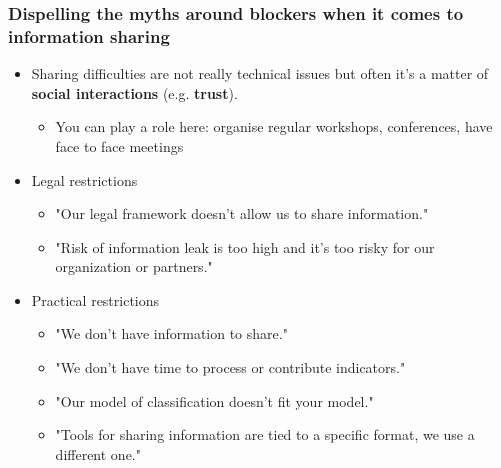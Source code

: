 \begin{frame}
\frametitle{Dispelling the myths around blockers when it comes to information sharing}
        \begin{itemize}
                \item Sharing difficulties are not really technical issues but often it's a matter of {\bf social interactions} (e.g. {\bf trust}).
		\begin{itemize}
			\item You can play a role here: organise regular workshops, conferences, have face to face meetings
		\end{itemize}
                \item Legal restrictions
                        \begin{itemize}
                                \item "Our legal framework doesn't allow us to share information."
                                \item "Risk of information leak is too high and it's too risky for our organization or partners."
                        \end{itemize}
                \item Practical restrictions
                        \begin{itemize}
                                \item "We don't have information to share."
                                \item "We don't have time to process or contribute indicators."
                                \item "Our model of classification doesn't fit your model."
                                \item "Tools for sharing information are tied to a specific format, we use a different one."
                        \end{itemize}
        \end{itemize}
\end{frame}

